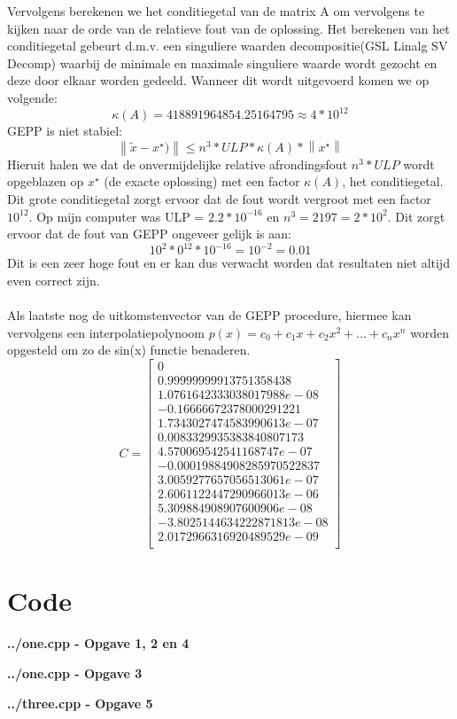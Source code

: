 \documentclass[10pt,a4paper]{article}
\begin{document}
Vervolgens berekenen we het conditiegetal van de matrix A om vervolgens te kijken naar de orde van de relatieve fout van de oplossing. Het berekenen van het conditiegetal gebeurt d.m.v. een singuliere waarden decompositie(GSL Linalg SV Decomp) waarbij de minimale en maximale singuliere waarde wordt gezocht en deze door elkaar worden gedeeld. Wanneer dit wordt uitgevoerd komen we op volgende:
$$
\kappa (A) = 418891964854.25164795 \approx 4*10^{12}
$$
GEPP is niet stabiel:
$$
\left \| \tilde{x} - x^{\star}) \right \| \leq n^3*ULP*\kappa(A)*\left \|  x^{\star} \right \|
$$
Hieruit halen we dat de onvermijdelijke relative afrondingsfout  $n^{3}*ULP$ wordt opgeblazen op $x^{\star}$ (de exacte oplossing) met een factor $\kappa(A)$, het conditiegetal. Dit grote conditiegetal zorgt ervoor dat de fout wordt vergroot met een factor $10^{12}$. Op mijn computer was ULP = $2.2*10^{-16}$ en $n^3 = 2197 = 2 * 10^{2}$. Dit zorgt ervoor dat de fout van GEPP ongeveer gelijk is aan: 
$$  10^{2} * 0^{12} * 10^{-16} = 10^{-2} = 0.01$$
Dit is een zeer hoge fout en er kan dus verwacht worden dat resultaten niet altijd even correct zijn.
\\
\\
Als laatste nog de uitkomstenvector van de GEPP procedure, hiermee kan vervolgens een interpolatiepolynoom $p(x) = c_{0} + c_{1}x + c_{2}x^{2} + \hdots + c_{n}x^{n}$ worden opgesteld om zo de sin(x) functie benaderen.
\\
$$
C =  \begin{bmatrix}
0 \\
0.99999999913751358438 \\
1.0761642333038017988e-08 \\
-0.16666672378000291221 \\
1.7343027474583990613e-07 \\
0.0083329935383840807173 \\
4.570069542541168747e-07 \\
-0.00019884908285970522837 \\
3.0059277657056513061e-07 \\
2.6061122447290966013e-06 \\
5.309884908907600906e-08 \\
-3.8025144634222871813e-08 \\
2.0172966316920489529e-09 \\
\end{bmatrix} 
$$

\section{Code}
\textbf{../one.cpp - Opgave 1, 2 en 4}


\textbf{../one.cpp - Opgave 3}


\textbf{../three.cpp - Opgave 5}

\end{document}
